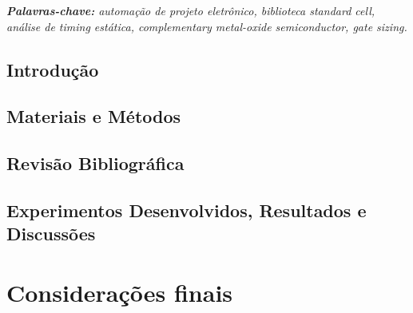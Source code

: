 \documentclass[
	12pt,				%
	openright,			%
	twoside,			%
	a4paper,			%
	english,			%
	french,				%
	spanish,			%
	brazil,				%
	]{abntex2}
\begin{document}
\begin{center}
\textit{\textbf{Palavras-chave:} automação de projeto eletrônico, biblioteca standard cell, análise de timing estática, complementary metal-oxide semiconductor, gate sizing.}
\end{center}

\section{Introdução}

\section{Materiais e Métodos}

\section{Revisão Bibliográfica}

\section{Experimentos Desenvolvidos, Resultados e Discussões}


\chapter*[Considerações finais]{Considerações finais}

\lipsum[31-33]

\postextual


\end{document}
